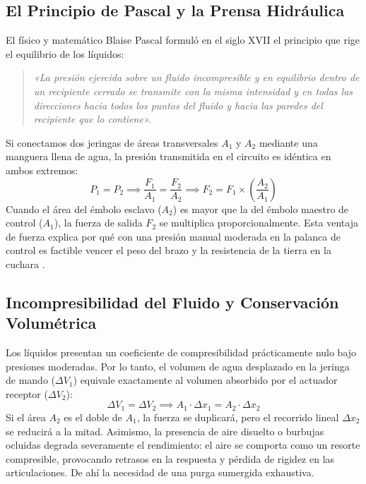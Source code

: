 \subsection{El Principio de Pascal y la Prensa Hidráulica}
El físico y matemático Blaise Pascal formuló en el siglo XVII el principio que rige el equilibrio de los líquidos:
\begin{quote}
    \textit{«La presión ejercida sobre un fluido incompresible y en equilibrio dentro de un recipiente cerrado se transmite con la misma intensidad y en todas las direcciones hacia todos los puntos del fluido y hacia las paredes del recipiente que lo contiene».} \parencite{perezmontiel2014}
\end{quote}
Si conectamos dos jeringas de áreas transversales $A_1$ y $A_2$ mediante una manguera llena de agua, la presión transmitida en el circuito es idéntica en ambos extremos:
\begin{equation}
    P_1 = P_2 \implies \frac{F_1}{A_1} = \frac{F_2}{A_2} \implies F_2 = F_1 \times \left( \frac{A_2}{A_1} \right)
\end{equation}
Cuando el área del émbolo esclavo ($A_2$) es mayor que la del émbolo maestro de control ($A_1$), la fuerza de salida $F_2$ se multiplica proporcionalmente. Esta ventaja de fuerza explica por qué con una presión manual moderada en la palanca de control es factible vencer el peso del brazo y la resistencia de la tierra en la cuchara \parencite{giancoli2008}.

\subsection{Incompresibilidad del Fluido y Conservación Volumétrica}
Los líquidos presentan un coeficiente de compresibilidad prácticamente nulo bajo presiones moderadas. Por lo tanto, el volumen de agua desplazado en la jeringa de mando ($\Delta V_1$) equivale exactamente al volumen absorbido por el actuador receptor ($\Delta V_2$):
\begin{equation}
    \Delta V_1 = \Delta V_2 \implies A_1 \cdot \Delta x_1 = A_2 \cdot \Delta x_2
\end{equation}
Si el área $A_2$ es el doble de $A_1$, la fuerza se duplicará, pero el recorrido lineal $\Delta x_2$ se reducirá a la mitad. Asimismo, la presencia de aire disuelto o burbujas ocluidas degrada severamente el rendimiento: el aire se comporta como un resorte compresible, provocando retrasos en la respuesta y pérdida de rigidez en las articulaciones. De ahí la necesidad de una purga sumergida exhaustiva.

